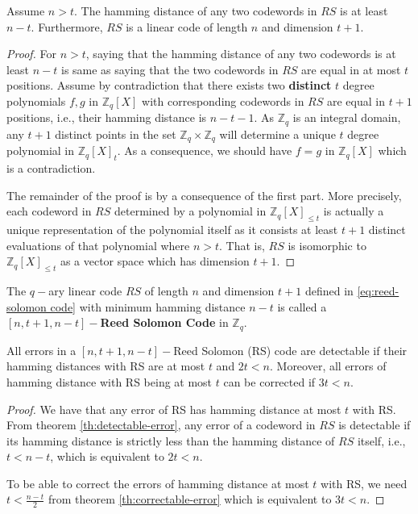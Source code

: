 \begin{lemma}
  Assume $n>t$. The hamming distance of any two codewords in $RS$ is at least $n-t$. Furthermore, $RS$ is 
  a linear code of length $n$ and dimension $t+1$.
\end{lemma}
\begin{proof}
  For $n>t$, saying that the hamming distance of any two codewords is at least $n-t$ is same as saying 
  that the two codewords in $RS$ are equal in at most $t$ positions. Assume by contradiction that 
  there exists two \textbf{distinct} $t$ degree polynomials $f,g$ in $\mathbb{Z}_q[X]$ with corresponding 
  codewords in $RS$ are equal in $t+1$ positions, i.e., their hamming distance is $n-t-1$. As 
  $\mathbb{Z}_q$ is an integral domain, any $t+1$ distinct points in the set 
  $\mathbb{Z}_q\times\mathbb{Z}_q$ will determine a unique $t$ degree polynomial in $\mathbb{Z}_q[X]_t$. 
  As a consequence, we should have $f=g$ in $\mathbb{Z}_q[X]$ which is a contradiction.\par 

  The remainder of the proof is by a consequence of the first part. More precisely, each codeword in 
  $RS$ determined by a polynomial in $\mathbb{Z}_q[X]_{\leq t}$ is actually a unique representation of the 
  polynomial itself as it consists at least $t+1$ distinct evaluations of that polynomial where $n>t$. 
  That is, $RS$ is isomorphic to $\mathbb{Z}_q[X]_{\leq t}$ as a vector space which has dimension $t+1$.
\end{proof}

\begin{definition}
  The $q-$ary linear code $RS$ of length $n$ and dimension $t+1$ defined in \eqref{eq:reed-solomon code} 
  with minimum hamming distance $n-t$ is called a \textbf{$[n, t+1, n-t]-$Reed Solomon Code}
  \cite{doi:10.1137/0108018} in $\mathbb{Z}_q$.
\end{definition}

\begin{corollary}\label{cor:detectable-correctable RS}
  All errors in a $[n, t+1, n-t]-$Reed Solomon (RS) code are detectable if their hamming distances with 
  RS are at most $t$ and $2t<n$. Moreover, all errors of hamming distance with RS being at most $t$ can 
  be corrected if $3t<n$.
\end{corollary}
\begin{proof}
  We have that any error of RS has hamming distance at most $t$ with RS. From theorem 
  \ref{th:detectable-error}, any error of a codeword in $RS$ is detectable if its hamming 
  distance is strictly less than the hamming distance of $RS$ itself, i.e., $t<n-t$, which is equivalent 
  to $2t<n$.\par

  To be able to correct the errors of hamming distance at most $t$ with RS, we need $t<\frac{n-t}{2}$ from 
  theorem \ref{th:correctable-error} which is equivalent to $3t<n$.
\end{proof}

